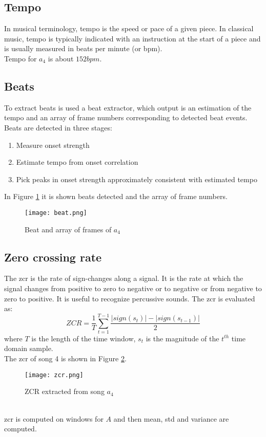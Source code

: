 \subsection{Tempo}
In musical terminology, tempo  is the speed or pace of a given piece. In classical music, tempo is typically indicated with an instruction at the start of a piece and is usually measured in beats per minute (or bpm).
\\
Tempo for $a_4$ is about $152 bpm$.

\subsection{Beats}
To extract beats is used a beat extractor, which output is an estimation of the tempo and an array of frame numbers corresponding to detected beat events.
\\
Beats are detected in three stages:
\begin{enumerate}	
	\item Measure onset strength
	\item Estimate tempo from onset correlation
	\item Pick peaks in onset strength approximately consistent with estimated tempo
\end{enumerate}
In Figure \ref{fig:beat} it is shown beats detected and the array of frame numbers.
\begin{figure}[h]
    \centering
    \texttt{[image: beat.png]} 
	\caption{Beat and array of frames of $a_4$}
    \label{fig:beat}
\end{figure}

\subsection{Zero crossing rate}
The \gls{zcr}  is the rate of sign-changes along a signal. It is the rate at which the signal changes from positive to zero to negative or to negative or from negative to zero to positive. It is useful to recognize percussive sounds.
The \gls{zcr} is evaluated as:
\begin{equation}
	ZCR=\dfrac{1}{T} \sum_{t=1}^{T-1}{\dfrac{|sign(s_t)|-|sign(s_{t-1})|}{2}}
\end{equation}
where $T$ is the length of the time window, $s_t$ is the magnitude of the $t^{th}$ time domain sample.
\\
The \gls{zcr} of song 4 is shown in Figure \ref{fig:zcr}.
\begin{figure}[h]
    \centering
    \texttt{[image: zcr.png]} 
	\caption{ZCR extracted from song $a_4$}
    \label{fig:zcr}
\end{figure}
\\
\gls{zcr} is computed on windows for $A$ and then mean, std and variance are computed.

